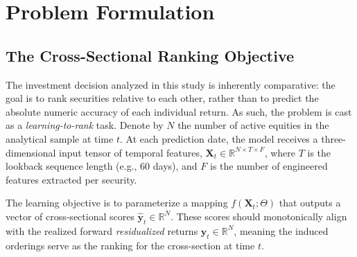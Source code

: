 



\section{Problem Formulation}
\subsection*{The Cross-Sectional Ranking Objective}

The investment decision analyzed in this study is inherently comparative: the goal is to rank securities relative to each other, rather than to predict the absolute numeric accuracy of each individual return. As such, the problem is cast as a \emph{learning-to-rank} task. Denote by $N$ the number of active equities in the analytical sample at time $t$. At each prediction date, the model receives a three-dimensional input tensor of temporal features, $\mathbf{X}_t \in \mathbb{R}^{N \times T \times F}$, where $T$ is the lookback sequence length (e.g., 60 days), and $F$ is the number of engineered features extracted per security.

The learning objective is to parameterize a mapping $f(\mathbf{X}_t; \Theta)$ that outputs a vector of cross-sectional scores $\mathbf{\hat{y}}_t \in \mathbb{R}^N$. These scores should monotonically align with the realized forward \emph{residualized} returns $\mathbf{y}_t \in \mathbb{R}^N$, meaning the induced orderings serve as the ranking for the cross-section at time $t$.

